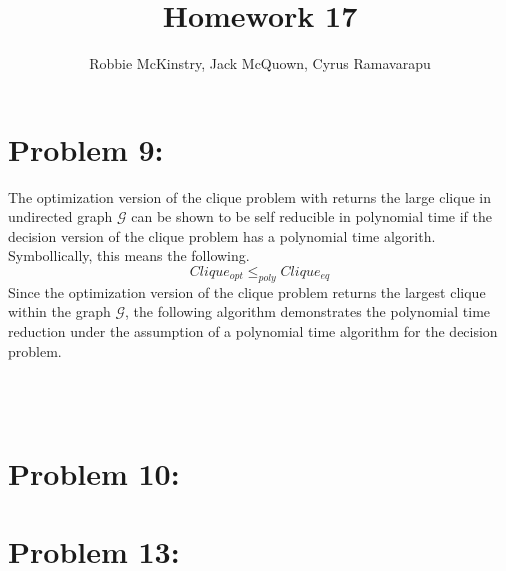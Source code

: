 \documentclass[12pt]{article}
\begin{document}
\title{Homework 17}
\author{Robbie McKinstry, Jack McQuown, Cyrus Ramavarapu}
\renewcommand{\today}{17 October 2016}
\renewcommand{\baselinestretch}{1.5}
\maketitle

\section*{Problem 9:}
The optimization version of the clique problem with returns the large clique in
undirected graph $\mathcal{G}$ can be shown to be self reducible in polynomial
time if the decision version of the clique problem has a polynomial time algorith.
Symbollically, this means the following.
\[
Clique_{opt} \leq_{poly} Clique_{eq}
\]
Since the optimization version of the clique problem returns the largest clique within
the graph $\mathcal{G}$, the following algorithm demonstrates the polynomial time
reduction under the assumption of a polynomial time algorithm for the decision problem.\\
\begin{algorithm}[H]
\\
\\
\end{algorithm}
\section*{Problem 10:}
\section*{Problem 13:}
\end{document}
